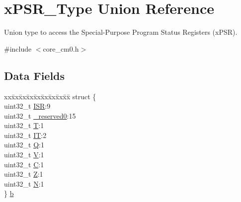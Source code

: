 \hypertarget{unionx_p_s_r___type}{}\section{x\+P\+S\+R\+\_\+\+Type Union Reference}
\label{unionx_p_s_r___type}


Union type to access the Special-\/\+Purpose Program Status Registers (x\+P\+SR).  




{\ttfamily \#include $<$core\+\_\+cm0.\+h$>$}

\subsection*{Data Fields}
\begin{DoxyCompactItemize}
\item 
\begin{tabbing}
xx\=xx\=xx\=xx\=xx\=xx\=xx\=xx\=xx\=\kill
struct \{\\
\>uint32\_t \mbox{\hyperlink{unionx_p_s_r___type_ad502ba7dbb2aab5f87c782b28f02622d}{ISR}}:9\\
\>uint32\_t \mbox{\hyperlink{unionx_p_s_r___type_ac8a6a13838a897c8d0b8bc991bbaf7c1}{\_reserved0}}:15\\
\>uint32\_t \mbox{\hyperlink{unionx_p_s_r___type_a6e1cf12e53a20224f6f62c001d9be972}{T}}:1\\
\>uint32\_t \mbox{\hyperlink{unionx_p_s_r___type_a76485660fe8ad98cdc71ddd7cb0ed777}{IT}}:2\\
\>uint32\_t \mbox{\hyperlink{unionx_p_s_r___type_a65f27ddc4f7e09c14ce7c5211b2e000a}{Q}}:1\\
\>uint32\_t \mbox{\hyperlink{unionx_p_s_r___type_acd4a2b64faee91e4a9eef300667fa222}{V}}:1\\
\>uint32\_t \mbox{\hyperlink{unionx_p_s_r___type_a7a1caf92f32fe9ebd8d1fe89b06c7776}{C}}:1\\
\>uint32\_t \mbox{\hyperlink{unionx_p_s_r___type_a5ae954cbd9986cd64625d7fa00943c8e}{Z}}:1\\
\>uint32\_t \mbox{\hyperlink{unionx_p_s_r___type_abae0610bc2a97bbf7f689e953e0b451f}{N}}:1\\
\} \mbox{\hyperlink{unionx_p_s_r___type_a8d8c45d946ef8df11f4cac72c667e98b}{b}}\\


\end{tabbing}
\end{DoxyCompactItemize}
